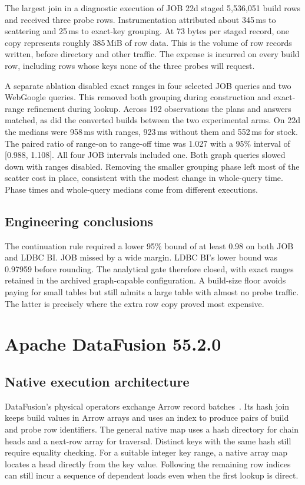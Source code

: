 \documentclass[11pt,a4paper]{article}
\begin{document}
The largest join in a diagnostic execution of JOB 22d staged 5,536,051 build rows and received
three probe rows. Instrumentation attributed about 345\,ms to scattering and 25\,ms to exact-key
grouping. At 73 bytes per staged record, one copy represents roughly 385\,MiB of row data. This is
the volume of row records written, before directory and other traffic. The expense is incurred on
every build row, including rows whose keys none of the three probes will request.

A separate ablation disabled exact ranges in four selected JOB queries and two WebGoogle queries.
This removed both grouping during construction and exact-range refinement during lookup. Across
192 observations the plans and answers matched, as did the converted builds between the two experimental
arms. On 22d the medians were 958\,ms with ranges, 923\,ms without them and 552\,ms for stock. The
paired ratio of range-on to range-off time was 1.027 with a 95\% interval of [0.988, 1.108]. All four
JOB intervals included one. Both graph queries slowed down with ranges disabled. Removing the
smaller grouping phase left most of the scatter cost in place, consistent with the modest change
in whole-query time. Phase times and whole-query medians come from different executions.

\subsection{Engineering conclusions}
The continuation rule required a lower 95\% bound of at least 0.98 on both JOB and LDBC BI. JOB
missed by a wide margin. LDBC BI's lower bound was 0.97959 before rounding. The analytical gate
therefore closed, with exact ranges retained in the archived graph-capable configuration. A
build-size floor avoids paying for small tables but still admits a large table with almost no
probe traffic. The latter is precisely where the extra row copy proved most expensive.

\section{Apache DataFusion 55.2.0}
\label{sec:df}
\subsection{Native execution architecture}
DataFusion's physical operators exchange Arrow record batches~\cite{lamb}. Its hash join keeps
build values in Arrow arrays and uses an index to produce pairs of build and probe row
identifiers. The general native map uses a hash directory for chain heads and a next-row array for
traversal. Distinct keys with the same hash still require equality checking. For a suitable
integer key range, a native array map locates a head directly from the key value. Following the
remaining row indices can still incur a sequence of dependent loads even when the first lookup is
direct.
\end{document}
